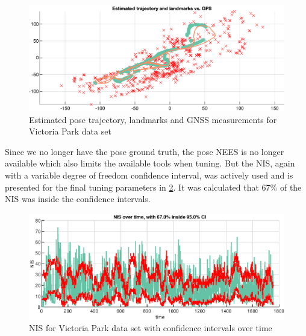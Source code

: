 \begin{figure}[!htb]
    \centering
    \includegraphics[width=0.7\linewidth]{figures/ga_3/real_trajectory.eps}
    \caption{Estimated pose trajectory, landmarks and GNSS measurements for Victoria Park data set}
    \label{fig:ga_3_real_trajectory}
\end{figure}

Since we no longer have the pose ground truth, the pose NEES is no longer available which also limits the available tools when tuning. But the NIS, again with a variable degree of freedom confidence interval, was actively used and is presented for the final tuning parameters in \cref{fig:ga_3_real_NIS}. It was calculated that 67\% of the NIS was inside the confidence intervals.  

\begin{figure}[!htb]
    \centering
    \includegraphics[width=0.8\linewidth]{figures/ga_3/real_NIS.eps}
    \caption{NIS for Victoria Park data set with confidence intervals over time}
    \label{fig:ga_3_real_NIS}
\end{figure}

